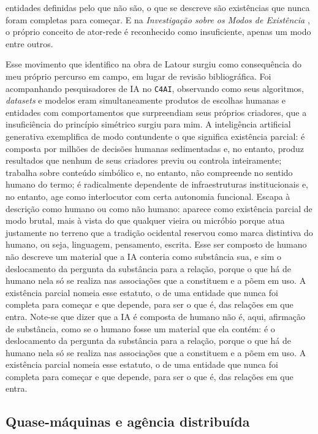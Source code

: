 entidades definidas pelo que não são, o que se descreve são existências que nunca foram completas para começar. E na \textit{Investigação sobre os Modos de Existência} \parencite*{Latour2019Investigacao}, o próprio conceito de ator-rede é reconhecido como insuficiente, apenas um modo entre outros.

Esse movimento que identifico na obra de Latour surgiu como consequência do meu próprio percurso em campo, em lugar de revisão bibliográfica.
Foi acompanhando pesquisadores de IA no \texttt{C4AI}, observando como seus algoritmos, \textit{datasets} e modelos eram simultaneamente produtos de escolhas humanas e entidades com comportamentos que surpreendiam seus próprios criadores, que a insuficiência do princípio simétrico surgiu para mim. A inteligência artificial generativa exemplifica de modo contundente o que significa existência parcial: é composta por milhões de decisões humanas sedimentadas e, no entanto, produz resultados que nenhum de seus criadores previu ou controla inteiramente; trabalha sobre conteúdo simbólico e, no entanto, não compreende no sentido humano do termo; é radicalmente dependente de infraestruturas institucionais e, no entanto, age como interlocutor com certa autonomia funcional. Escapa à descrição como humano ou como não humano: aparece como existência parcial de modo brutal, mais à vista do que qualquer vieira ou micróbio porque atua justamente no terreno que a tradição ocidental reservou como marca distintiva do humano, ou seja, linguagem, pensamento, escrita. Esse ser composto de humano não descreve um material que a IA conteria como substância sua, e sim o deslocamento da pergunta da substância para a relação, porque o que há de humano nela só se realiza nas associações que a constituem e a põem em uso. A existência parcial nomeia esse estatuto, o de uma entidade que nunca foi completa para começar e que depende, para ser o que é, das relações em que entra. Note-se que dizer que a IA é composta de humano não é, aqui, afirmação de substância, como se o humano fosse um material que ela contém: é o deslocamento da pergunta da substância para a relação, porque o que há de humano nela só se realiza nas associações que a constituem e a põem em uso. A existência parcial nomeia esse estatuto, o de uma entidade que nunca foi completa para começar e que depende, para ser o que é, das relações em que entra.

\subsection{Quase-máquinas e agência distribuída}

